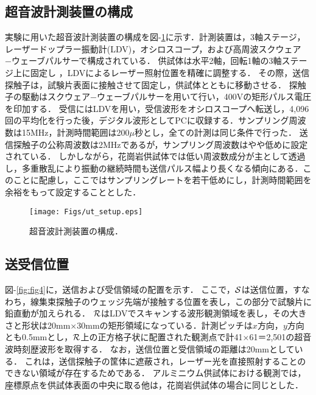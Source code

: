 \subsection{超音波計測装置の構成}
実験に用いた超音波計測装置の構成を図-\ref{fig:fig3}に示す．計測装置は，3軸ステージ，レーザードップラー振動計(LDV)，オシロスコープ，および高周波スクウェア−ウェーブパルサーで構成されている．
供試体は水平2軸，回転1軸の3軸ステージ上に固定し ，LDVによるレーザー照射位置を精確に調整する．
その際，送信探触子は，試験片表面に接触させて固定し，供試体とともに移動させる．
探触子の駆動はスクウェア−ウェーブパルサーを用いて行い，400Vの矩形パルス電圧を印加する．
受信にはLDVを用い，受信波形をオシロスコープへ転送し，4,096回の平均化を行った後，デジタル波形としてPCに収録する．サンプリング周波数は15MHz，計測時間範囲は200$\mu$秒とし，全ての計測は同じ条件で行った．
送信探触子の公称周波数は2MHzであるが，サンプリング周波数はやや低めに設定されている．
しかしながら，花崗岩供試体では低い周波数成分が主として透過し，多重散乱により振動の継続時間も送信パルス幅より長くなる傾向にある．このことに配慮し，ここではサンプリングレートを若干低めにし，計測時間範囲を余裕をもって設定することとした．
\begin{figure}[t]
\begin{center}
\texttt{[image: Figs/ut\_setup.eps]}
\caption{ 超音波計測装置の構成． }
\label{fig:fig3}
\end{center}
	\vspace{-15mm}
\end{figure}
\subsection{送受信位置}
図-\ref{fig:fig4}に，送信および受信領域の配置を示す．
ここで，${\cal S}$は送信位置，すなわち，線集束探触子のウェッジ先端が接触する位置を表し，この部分で試験片に鉛直動が加えられる．
${\cal R}$はLDVでスキャンする波形観測領域を表し，その大きさと形状は20mm$\times$30mmの矩形領域になっている．計測ピッチは$x$方向，$y$方向とも0.5mmとし，$\cal R$上の正方格子状に配置された観測点で計41×61＝2,501の超音波時刻歴波形を取得する．
なお，送信位置と受信領域の距離は20mmとしている．
これは，送信探触子の筐体に遮蔽され，レーザー光を直接照射することのできない領域が存在するためである．
アルミニウム供試体における観測では，座標原点を供試体表面の中央に取る他は，花崗岩供試体の場合に同じとした．

